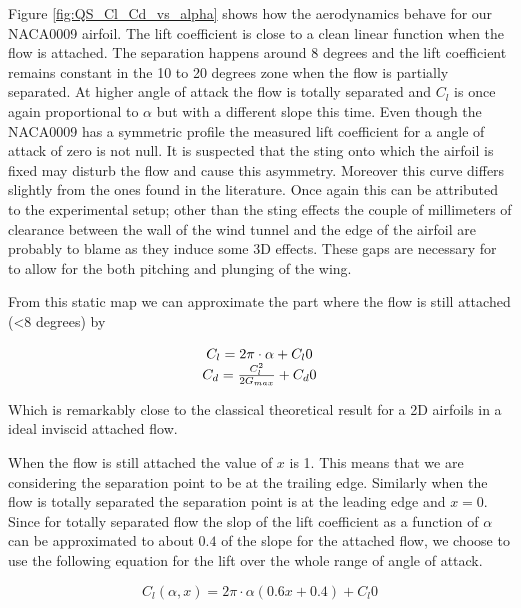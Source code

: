 \par Figure \ref{fig:QS_Cl_Cd_vs_alpha} shows how the aerodynamics behave for our NACA0009 airfoil.
The lift coefficient is close to a clean linear function when the flow is attached.
The separation happens around 8 degrees and the lift coefficient remains constant in the 10 to 20 degrees zone when the flow is partially separated.
At higher angle of attack the flow is totally separated and $C_l$ is once again proportional to $\alpha$ but with a different slope this time.
Even though the NACA0009 has a symmetric profile the measured lift coefficient for a angle of attack of zero is not null.
It is suspected that the sting onto which the airfoil is fixed may disturb the flow and cause this asymmetry.
Moreover this curve differs slightly from the ones found in the literature.
Once again this can be attributed to the experimental setup; other than the sting effects the couple of millimeters of clearance between the wall of the wind tunnel and the edge of the airfoil are probably to blame as they induce some 3D effects.
These gaps are necessary for to allow for the both pitching and plunging of the wing.

\par From this static map we can approximate the part where the flow is still attached (<8 degrees) by 

\begin{equation}
	\begin{array}[c]{c}
		C_l= 2 \pi \cdot \alpha + C_l0 \\
		C_d= \frac{C_l^2}{2G_{max}} + C_d0
	\end{array}
	\label{eqn:attached_Cl_and_Cd_vs_alpha}
\end{equation}

Which is remarkably close to the classical theoretical result for a 2D airfoils in a ideal inviscid attached flow.

When the flow is still attached the value of $x$ is 1. 
This means that we are considering the separation point to be at the trailing edge.
Similarly when the flow is totally separated the separation point is at the leading edge and $x=0$.
Since for totally separated flow the slop of the lift coefficient as a function of $\alpha$ can be approximated to about $0.4$ of the slope for the attached flow, we choose to use the following equation for the lift over the whole range of angle of attack. 


\begin{equation}
	C_l(\alpha,x)=2 \pi \cdot \alpha (0.6 x + 0.4) + C_l0
	\label{eqn:Cl_function}
\end{equation}

